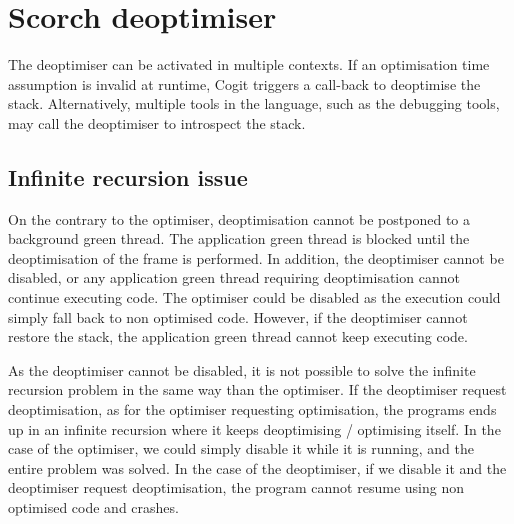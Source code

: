 \documentclass[a4paper,12pt,twoside]{../includes/ThesisStyle}
\begin{document}



\section{Scorch deoptimiser}

The deoptimiser can be activated in multiple contexts. If an optimisation time assumption is invalid at runtime, Cogit triggers a call-back to deoptimise the stack. Alternatively, multiple tools in the language, such as the debugging tools, may call the deoptimiser to introspect the stack.

\subsection{Infinite recursion issue}




On the contrary to the optimiser, deoptimisation cannot be postponed to a background green thread. The application green thread is blocked until the deoptimisation of the frame is performed. In addition, the deoptimiser cannot be disabled, or any application green thread requiring deoptimisation cannot continue executing code. The optimiser could be disabled as the execution could simply fall back to non optimised code. However, if the deoptimiser cannot restore the stack, the application green thread cannot keep executing code.

As the deoptimiser cannot be disabled, it is not possible to solve the infinite recursion problem in the same way than the optimiser. If the deoptimiser request deoptimisation, as for the optimiser requesting optimisation, the programs ends up in an infinite recursion where it keeps deoptimising / optimising itself. In the case of the optimiser, we could simply disable it while it is running, and the entire problem was solved. In the case of the deoptimiser, if we disable it and the deoptimiser request deoptimisation, the program cannot resume using non optimised code and crashes. 
\end{document}
